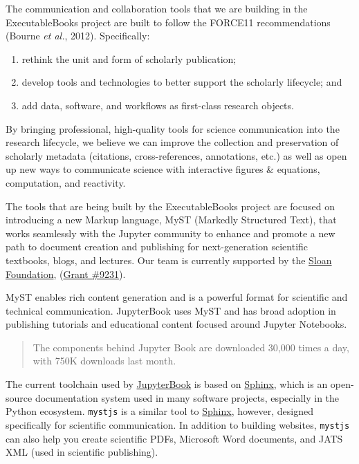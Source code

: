 \documentclass{article}
\begin{document}
The communication and collaboration tools that we are building in the ExecutableBooks project are built to follow the FORCE11 recommendations (Bourne \textit{et al.}, 2012). Specifically:

\begin{enumerate}
\item rethink the unit and form of scholarly publication;
\item develop tools and technologies to better support the scholarly lifecycle; and
\item add data, software, and workflows as first-class research objects.
\end{enumerate}

By bringing professional, high-quality tools for science communication into the research lifecycle, we believe we can improve the collection and preservation of scholarly metadata (citations, cross-references, annotations, etc.) as well as open up new ways to communicate science with interactive figures \& equations, computation, and reactivity.

The tools that are being built by the ExecutableBooks project are focused on introducing a new Markup language, MyST (Markedly Structured Text), that works seamlessly with the Jupyter community to enhance and promote a new path to document creation and publishing for next-generation scientific textbooks, blogs, and lectures. Our team is currently supported by the \href{https://sloan.org}{Sloan Foundation}, (\href{https://sloan.org/grant-detail/9231}{Grant \#9231}).

MyST enables rich content generation and is a powerful format for scientific and technical communication. JupyterBook uses MyST and has broad adoption in publishing tutorials and educational content focused around Jupyter Notebooks.

\begin{quote}
The components behind Jupyter Book are downloaded 30,000 times a day, with 750K downloads last month.
\end{quote}

The current toolchain used by \href{https://jupyterbook.org/}{JupyterBook} is based on \href{https://www.sphinx-doc.org/}{Sphinx}, which is an open-source documentation system used in many software projects, especially in the Python ecosystem. \texttt{mystjs} is a similar tool to \href{https://www.sphinx-doc.org/}{Sphinx}, however, designed specifically for scientific communication. In addition to building websites, \texttt{mystjs} can also help you create scientific PDFs, Microsoft Word documents, and JATS XML (used in scientific publishing).
\end{document}
